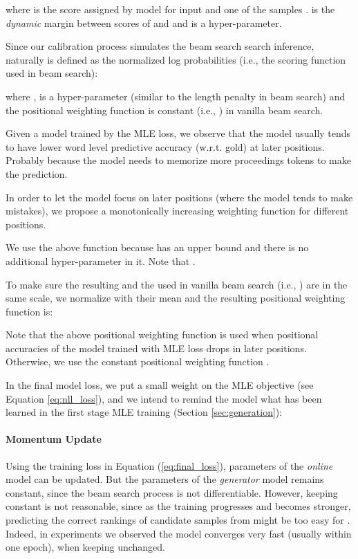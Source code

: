 \documentclass{article}
\begin{document}
where  is the  score assigned by model  for input  and one of the samples .  is the \emph{dynamic} margin between scores of  and  and  is a hyper-parameter.


Since our calibration process simulates the beam search search inference, naturally   is defined as the normalized log probabilities (i.e., the scoring function used in beam search):

where ,  is a hyper-parameter (similar to the length penalty in beam search) and the positional weighting function is constant (i.e., ) in vanilla beam search.



Given a model trained by the MLE loss, we observe that 
the model usually tends to have lower word level predictive accuracy (w.r.t. gold) at later positions. Probably because the model needs to memorize more proceedings tokens to make the prediction.

In order to let the model focus on later positions (where the model tends to make mistakes), we propose a monotonically increasing weighting function for different positions.


We use the above function because  has an upper bound and there is no additional hyper-parameter in it. Note that .

To make sure the resulting  and the  used in vanilla beam search (i.e., )
are in the same scale, we normalize  with their mean and the resulting positional weighting function is:


Note that the above positional weighting function is used when positional accuracies of the model trained with MLE loss drops in later positions. Otherwise, we use the constant positional weighting function .

In the final model loss, we put a small weight on the MLE objective (see Equation \ref{eq:nll_loss}), and we intend to remind the model what has been learned in the first stage MLE training (Section \ref{sec:generation}):



\paragraph{Momentum Update} Using the training loss in Equation (\ref{eq:final_loss}), parameters of the \emph{online} model  can be updated. But the parameters of the \mbox{\emph{generator}} model  remains constant, since the beam search process is not differentiable. However, keeping  constant is not reasonable, since as the training progresses and  becomes stronger, predicting the correct rankings of candidate samples from  might be too easy for . Indeed, in experiments we observed the model converges very fast (usually within one epoch), when keeping  unchanged. 
\end{document}
